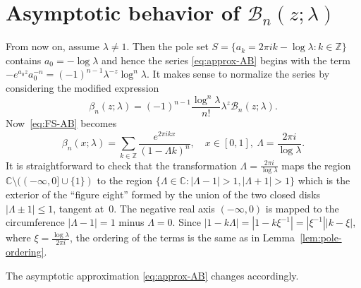 \documentclass[11pt,a4paper]{amsart}
\newcommand{\Z}{\mathbb{Z}}
\newcommand{\C}{\mathbb{C}}
\newcommand{\B}{\mathcal{B}}
\theoremstyle{plain}
\theoremstyle{remark}
\begin{document}
\section{Asymptotic behavior of $\B_{n}(z;\lambda)$}
\label{sec:asympt}



From now on, assume $\lambda \neq 1$. Then the pole set $S = \{ a_{k} = 2\pi i k - \log\lambda : k \in \Z \}$ contains $a_{0} = -\log\lambda$ and hence the series \eqref{eq:approx-AB} 
begins with the term $-e^{a_{0}z} a_{0}^{-n} = (-1)^{n-1} \lambda^{-z} \log^{n}\lambda$. It makes sense to normalize the series by considering the modified expression
%
\begin{equation}
\label{def:ab-normalized}
	\beta_{n}(z;\lambda) = (-1)^{n-1} \frac{\log^{n} \lambda}{n!} \lambda^{z} \B_{n}(z;\lambda).
\end{equation}
%
Now~\eqref{eq:FS-AB} becomes
%
\begin{equation}
\label{eq:FS-AB-mod}
	  \beta_{n}(x;\lambda)
	= \sum_{k \in \Z} \frac{e^{2 \pi i k x}}{(1 - \Lambda k)^{n}},
	\quad
	x \in [0,1],\
	\Lambda = \frac{2\pi i}{\log\lambda}.
\end{equation}
%
It is straightforward to check that the transformation
$\Lambda = \frac{2\pi i}{\log \lambda}$ maps the region 
$\C \setminus ((-\infty,0] \cup \{1\})$ to the region $\{ \Lambda \in \C : |\Lambda-1| > 1, |\Lambda+1| > 1 \}$ which is the exterior of the ``figure eight'' formed by the union of the two closed disks $|\Lambda \pm 1| \leq 1$, tangent at~$0$. The negative real axis $(-\infty,0)$ is mapped to the circumference $|\Lambda-1|=1$ minus $\Lambda=0$. 
Since $|1-k\Lambda|=|1-k\xi^{-1}| = |\xi^{-1}| |k -\xi|$, where $\xi = \frac{\log\lambda}{2\pi i}$, the ordering of the terms is the same as in Lemma~\ref{lem:pole-ordering}.


The asymptotic approximation \eqref{eq:approx-AB} changes accordingly.
\end{document}
